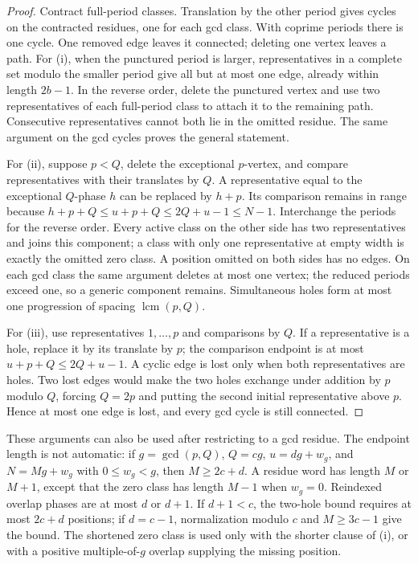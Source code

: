 \documentclass[11pt,a4paper]{amsart}
\numberwithin{equation}{section}
\theoremstyle{plain}
\theoremstyle{definition}
\begin{document}
\begin{proof}
Contract full-period classes.  Translation by the other period gives cycles on the contracted residues, one for each gcd class.  With coprime periods there is one cycle.  One removed edge leaves it connected; deleting one vertex leaves a path.  For (i), when the punctured period is larger, representatives in a complete set modulo the smaller period give all but at most one edge, already within length \(2b-1\).  In the reverse order, delete the punctured vertex and use two representatives of each full-period class to attach it to the remaining path.  Consecutive representatives cannot both lie in the omitted residue.  The same argument on the gcd cycles proves the general statement.

For (ii), suppose \(p<Q\), delete the exceptional \(p\)-vertex, and compare representatives with their translates by \(Q\).  A representative equal to the exceptional \(Q\)-phase \(h\) can be replaced by \(h+p\).  Its comparison remains in range because
\(h+p+Q\le u+p+Q\le2Q+u-1\le N-1\).
Interchange the periods for the reverse order.  Every active class on the other side has two representatives and joins this component; a class with only one representative at empty width is exactly the omitted zero class.  A position omitted on both sides has no edges.  On each gcd class the same argument deletes at most one vertex; the reduced periods exceed one, so a generic component remains.  Simultaneous holes form at most one progression of spacing \(\operatorname{lcm}(p,Q)\).

For (iii), use representatives \(1,\ldots,p\) and comparisons by \(Q\).  If a representative is a hole, replace it by its translate by \(p\); the comparison endpoint is at most \(u+p+Q\le2Q+u-1\).  A cyclic edge is lost only when both representatives are holes.  Two lost edges would make the two holes exchange under addition by \(p\) modulo \(Q\), forcing \(Q=2p\) and putting the second initial representative above \(p\).  Hence at most one edge is lost, and every gcd cycle is still connected.
\end{proof}

These arguments can also be used after restricting to a gcd residue.  The endpoint length is not automatic: if \(g=\gcd(p,Q)\), \(Q=cg\), \(u=dg+w_g\), and \(N=Mg+w_g\) with \(0\le w_g<g\), then \(M\ge2c+d\).  A residue word has length \(M\) or \(M+1\), except that the zero class has length \(M-1\) when \(w_g=0\).  Reindexed overlap phases are at most \(d\) or \(d+1\).  If \(d+1<c\), the two-hole bound requires at most \(2c+d\) positions; if \(d=c-1\), normalization modulo \(c\) and \(M\ge3c-1\) give the bound.  The shortened zero class is used only with the shorter clause of (i), or with a positive multiple-of-\(g\) overlap supplying the missing position.
\end{document}
